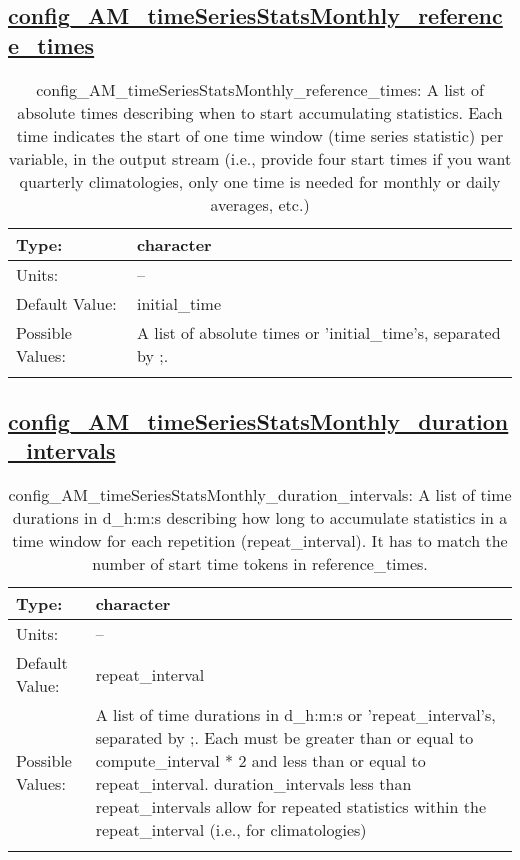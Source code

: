 \subsection[config\_AM\_timeSeriesStatsMonthly\_reference\_times]{\hyperref[sec:nm_tab_AM_timeSeriesStatsMonthly]{config\_AM\_timeSeriesStatsMonthly\_reference\_times}}
\label{subsec:nm_sec_config_AM_timeSeriesStatsMonthly_reference_times}
\begin{center}
\begin{longtable}{| p{2.0in} || p{4.0in} |}
    \hline
    Type: & character \\
    \hline
    Units: & -- \\
    \hline
    Default Value: & initial\_time \\
    \hline
    Possible Values: & A list of absolute times or 'initial\_time's, separated by ;. \\
    \hline
    \caption{config\_AM\_timeSeriesStatsMonthly\_reference\_times: A list of absolute times describing when to start accumulating statistics. Each time indicates the start of one time window (time series statistic) per variable, in the output stream (i.e., provide four start times if you want quarterly climatologies, only one time is needed for monthly or daily averages, etc.)}
\end{longtable}
\end{center}
\subsection[config\_AM\_timeSeriesStatsMonthly\_duration\_intervals]{\hyperref[sec:nm_tab_AM_timeSeriesStatsMonthly]{config\_AM\_timeSeriesStatsMonthly\_duration\_intervals}}
\label{subsec:nm_sec_config_AM_timeSeriesStatsMonthly_duration_intervals}
\begin{center}
\begin{longtable}{| p{2.0in} || p{4.0in} |}
    \hline
    Type: & character \\
    \hline
    Units: & -- \\
    \hline
    Default Value: & repeat\_interval \\
    \hline
    Possible Values: & A list of time durations in d\_h:m:s or 'repeat\_interval's, separated by ;. Each must be greater than or equal to compute\_interval * 2 and less than or equal to repeat\_interval. duration\_intervals less than repeat\_intervals allow for repeated statistics within the repeat\_interval (i.e., for climatologies) \\
    \hline
    \caption{config\_AM\_timeSeriesStatsMonthly\_duration\_intervals: A list of time durations in d\_h:m:s describing how long to accumulate statistics in a time window for each repetition (repeat\_interval). It has to match the number of start time tokens in reference\_times.}
\end{longtable}
\end{center}
